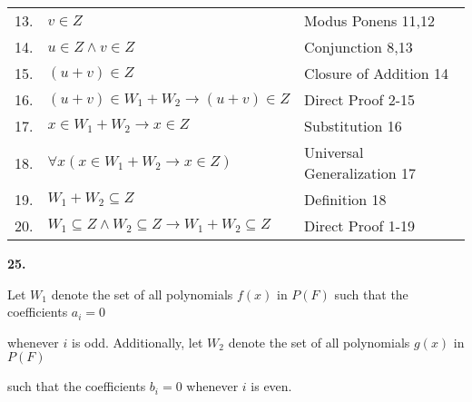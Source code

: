 \documentclass[12pt, a4paper]{article}
\begin{document}
\begin{table}[h!]
\begin{center}
\begin{tabular}{l l l}
        13.& \hspace{20mm}$v\in Z$ & Modus Ponens 11,12\\
        
        14.& \hspace{20mm}$u\in Z\wedge v\in Z$ & Conjunction 8,13\\
        
        15.& \hspace{20mm}$(u+v)\in Z$ & Closure of Addition 14\\
        
        16.& \hspace{10mm}$(u+v)\in W_1+W_2\rightarrow(u+v)\in Z$ & Direct Proof 2-15\\
        
        17.& \hspace{10mm}$x\in W_1+W_2\rightarrow x\in Z$ & Substitution 16\\
        
        18.& \hspace{10mm}$\forall x(x\in W_1+W_2\rightarrow x\in Z)$ & Universal Generalization 17\\
        
        19.& \hspace{10mm}$W_1+W_2\subseteq Z$ & Definition 18\\
        
        20.& $W_1\subseteq Z\wedge W_2\subseteq Z\rightarrow W_1+W_2\subseteq Z$ & Direct Proof 1-19\\
        
        \hline
        \end{tabular}
    \end{center}
\end{table}

\hspace{150mm}\blacksquare

\vspace{4mm}

\noindent\textbf{25.}\par

\vspace{4mm}

Let $W_1$ denote the set of all polynomials $f(x)$ in $P(F)$ such that the coefficients $a_i=0$\par whenever $i$ is odd. Additionally, let $W_2$ denote the set of all polynomials $g(x)$ in $P(F)$\par such that the coefficients $b_i=0$ whenever $i$ is even.
\end{document}
